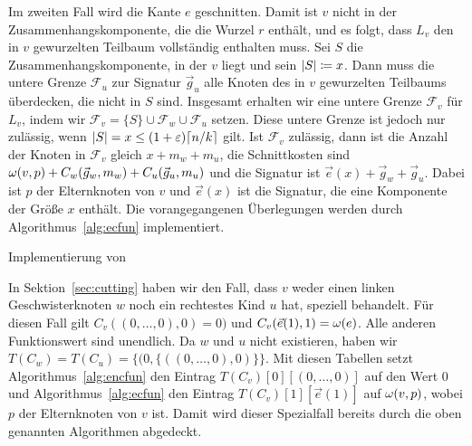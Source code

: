 Im zweiten Fall wird die Kante $e$ geschnitten.
 Damit ist $v$ nicht in der Zusammenhangskomponente, die die Wurzel $r$ enthält, und es folgt, dass $L_v$ den in $v$ gewurzelten Teilbaum vollständig enthalten muss. 
Sei $S$ die Zusammenhangskomponente, in der $v$ liegt und sein $\lvert S\rvert \coloneqq x$.
Dann muss die untere Grenze $\mathcal{F}_u$ zur Signatur $\vec{g}_u$ alle Knoten des in $v$ gewurzelten Teilbaums überdecken, die nicht in $S$ sind.
Insgesamt erhalten wir eine untere Grenze $\mathcal{F}_v$ für $L_v$, indem wir $\mathcal{F}_v = \{S\} \cup \mathcal{F}_w \cup \mathcal{F}_u$ setzen.
Diese untere Grenze ist jedoch nur zulässig, wenn $\lvert S\rvert = x \leq (1+\varepsilon)\lceil n/k\rceil$ gilt.
Ist $\mathcal{F}_v$ zulässig, dann ist die Anzahl der Knoten in $\mathcal{F}_v$ gleich $x + m_w + m_u$, die Schnittkosten sind $\omega(v,p) + C_w(\vec{g}_w, m_w) + C_u(\vec{g}_u, m_u)$ und die Signatur ist $\vec{e}(x) + \vec{g}_w + \vec{g}_u$.
Dabei ist $p$ der Elternknoten von $v$ und $\vec{e}(x)$ ist die Signatur, die eine Komponente der Größe $x$ enthält.
Die vorangegangenen Überlegungen werden durch Algorithmus~\ref{alg:ecfun} implementiert.


\begin{algorithm}
    \caption{Implementierung von }\label{alg:ecfun}
    \begin{algorithmic}[1]
             
                \Return
            \Else
                 
            \EndIf
        \EndFunction
    \end{algorithmic}
\end{algorithm}

\begin{rem}
    In Sektion~\ref{sec:cutting} haben wir den Fall, dass $v$ weder einen linken Geschwisterknoten $w$ noch ein rechtestes Kind $u$ hat, speziell behandelt.
    Für diesen Fall gilt $C_v((0,\ldots,0), 0) = 0)$ und $C_v(\vec{e}(1), 1) = \omega(e)$. 
    Alle anderen Funktionswert sind unendlich.
    Da $w$ und $u$ nicht existieren, haben wir $T(C_w) = T(C_u) = \{(0, \{((0, \ldots, 0), 0)\} \}$.
    Mit diesen Tabellen setzt Algorithmus~\ref{alg:encfun} den Eintrag $T(C_v)[0][(0,\ldots, 0)]$ auf den Wert $0$ und Algorithmus~\ref{alg:ecfun} den Eintrag $T(C_v)[1][\vec{e}(1)]$ auf $\omega(v,p)$, wobei $p$ der Elternknoten von $v$ ist.
    Damit wird dieser Spezialfall bereits durch die oben genannten Algorithmen abgedeckt.
\end{rem}

